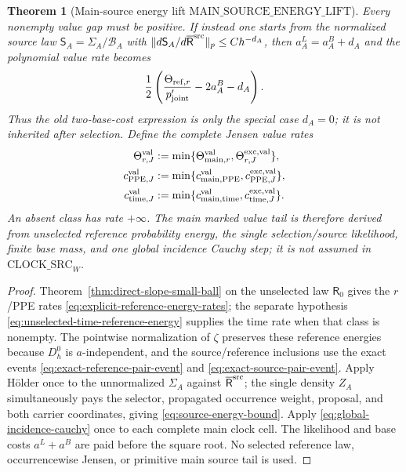 \documentclass[11pt]{article}
\newtheorem{theorem}{Theorem}[section]
\begin{document}
\begin{theorem}[Main-source energy lift
$\mathrm{MAIN\_SOURCE\_ENERGY\_LIFT}$]
Every nonempty value gap must be positive.  If instead one starts from the
normalized source law $\mathsf S_A=\Sigma_A/\mathcal B_A$ with
$\|d\mathsf S_A/d\overline{\mathsf R}^{\rm src}\|_p\le Ch^{-d_A}$, then
$a_A^{L}=a_A^{B}+d_A$ and the polynomial value rate becomes
\begin{equation}
\label{eq:normalized-selection-rate-special-case}
 \frac12\left(\frac{\Theta_{{\rm ref},r}}{p_{\rm joint}'}
                 -2a_A^{B}-d_A\right).
\end{equation}
Thus the old two-base-cost expression is only the special case $d_A=0$;
it is not inherited after selection.  Define the complete Jensen value rates
\begin{equation}
\label{eq:complete-Jensen-value-rates}
\begin{aligned}
 \Theta_{r,J}^{\rm val}&:=\min\{
   \Theta_{{\rm main},r}^{\rm val},
   \Theta_{r,J}^{\rm exc,val}\},\\
 c_{{\rm PPE},J}^{\rm val}&:=\min\{
   c_{{\rm main},{\rm PPE}}^{\rm val},
   c_{{\rm PPE},J}^{\rm exc,val}\},\\
 c_{{\rm time},J}^{\rm val}&:=\min\{
   c_{{\rm main},{\rm time}}^{\rm val},
   c_{{\rm time},J}^{\rm exc,val}\}.
\end{aligned}
\end{equation}
An absent class has rate $+\infty$.  The main marked value tail is therefore
derived from unselected reference probability energy, the single
selection/source likelihood, finite base mass, and one global incidence
Cauchy step; it is not
assumed in
$\mathrm{CLOCK\_SRC}_{W}$.
\end{theorem}

\begin{proof}
Theorem~\ref{thm:direct-slope-small-ball} on the unselected law
$\mathsf R_0$ gives the $r$/PPE rates
\eqref{eq:explicit-reference-energy-rates}; the separate hypothesis
\eqref{eq:unselected-time-reference-energy} supplies the time rate when that
class is nonempty.  The pointwise normalization of $\zeta$ preserves these reference
energies because $D_h^0$ is $a$-independent, and the source/reference
inclusions use the exact events
\eqref{eq:exact-reference-pair-event} and
\eqref{eq:exact-source-pair-event}.  Apply H\"older once to the unnormalized $\Sigma_A$ against
$\overline{\mathsf R}^{\rm src}$; the single density $Z_A$ simultaneously pays the
selector, propagated occurrence weight, proposal, and both carrier
coordinates, giving \eqref{eq:source-energy-bound}.  Apply
\eqref{eq:global-incidence-cauchy} once to each complete main clock cell.
The likelihood and base costs $a^L+a^B$ are paid before the square root.  No
selected reference law, occurrencewise Jensen, or primitive main source tail
is used.
\end{proof}
\end{document}
